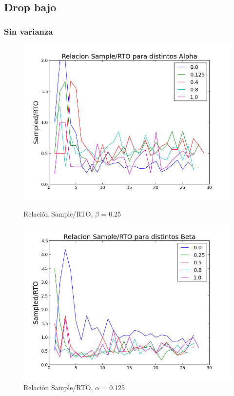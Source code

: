 \subsection{Drop bajo}
\subsubsection{Sin varianza}

\begin{figure}[H]
\begin{minipage}{0.5\linewidth}
\includegraphics[width=\linewidth]{../graficos/alphavar0drop30.png}
\caption{Relación Sample/RTO, $\beta$ = 0.25}\label{fig:alpha-var0-drop30}
\end{minipage}
\hfill
\begin{minipage}{0.5\linewidth}
\includegraphics[width=\linewidth]{../graficos/betavar0drop30.png}
\caption{Relación Sample/RTO, $\alpha$ = 0.125}\label{fig:beta-var0-drop30}
\end{minipage}
\end{figure}

